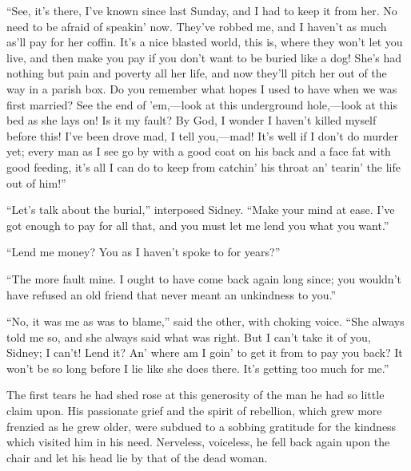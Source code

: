 ``See, it's there, I've known since last Sunday, and I had to keep it
from her. No need to be afraid of speakin' now. They've robbed me, and I
haven't as much as'll pay for her coffin. It's a nice blasted world,
this is, where they won't let you live, and then make you pay if you
don't want to be buried like a dog! She's had nothing but pain and
{\protect\hypertarget{172}{}{}}poverty all her life, and now they'll
pitch her out of the way in a parish box. Do you remember what hopes I
used to have when we was first married? See the end of 'em,---look at
this underground hole,---look at this bed as she lays on! Is it my
fault? By God, I wonder I haven't killed myself before this! I've been
drove mad, I tell you,---mad! It's well if I don't do murder yet; every
man as I see go by with a good coat on his back and a face fat with good
feeding, it's all I can do to keep from catchin' his throat an' tearin'
the life out of him!''

``Let's talk about the burial,'' interposed Sidney. ``Make your mind at
ease. I've got enough to pay for all that, and you must let me lend you
what you want.''

``Lend me money? You as I haven't spoke to for years?''

``The more fault mine. I ought to have come back again long since; you
wouldn't have refused an old friend that never meant an unkindness to
you.''

``No, it was me as was to blame,'' said the
{\protect\hypertarget{173}{}{}}other, with choking voice. ``She always
told me so, and she always said what was right. But I can't take it of
you, Sidney; I can't! Lend it? An' where am I goin' to get it from to
pay you back? It won't be so long before I lie like she does there. It's
getting too much for me.''

The first tears he had shed rose at this generosity of the man he had so
little claim upon. His passionate grief and the spirit of rebellion,
which grew more frenzied as he grew older, were subdued to a sobbing
gratitude for the kindness which visited him in his need. Nerveless,
voiceless, he fell back again upon the chair and let his head lie by
that of the dead woman.
